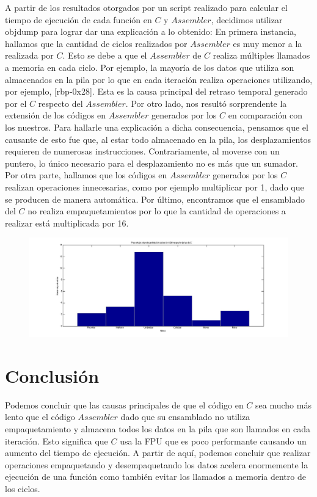 \documentclass[10pt, a4paper]{article}
\begin{document}
A partir de los resultados otorgados por un script realizado para calcular el tiempo de ejecución de cada función en $C$ y $Assembler$, decidimos utilizar objdump para lograr dar una explicación a lo obtenido:\newline
En primera instancia, hallamos que la cantidad de ciclos realizados por $Assembler$ es muy menor a la realizada por $C$. Esto se debe a que el $Assembler$ de $C$ realiza múltiples llamados a memoria en cada ciclo. Por ejemplo, la mayoría de los datos que utiliza son almacenados en la pila por lo que en cada iteración realiza operaciones utilizando, por ejemplo, [rbp-0x28]. Esta es la causa principal del retraso temporal generado por el $C$ respecto del $Assembler$. \newline 
Por otro lado, nos resultó sorprendente la extensión de los códigos en $Assembler$ generados por los $C$ en comparación con los nuestros. Para hallarle una explicación a dicha consecuencia, pensamos que el causante de esto fue que, al estar todo almacenado en la pila, los desplazamientos requieren de numerosas instrucciones. Contrariamente, al moverse con un puntero, lo único necesario para el desplazamiento no es más que un sumador. \newline
Por otra parte, hallamos que los códigos en $Assembler$ generados por los $C$ realizan operaciones innecesarias, como por ejemplo multiplicar por 1, dado que se producen de manera automática.\newline
Por último, encontramos que el ensamblado del $C$ no realiza empaquetamientos por lo que la cantidad de operaciones a realizar está multiplicada por 16.\newline
\begin{figure}[H] %
\begin{center}
\includegraphics[width=520pt]{./velocidad.jpg}
\end{center}
\end{figure}
\section{Conclusi\'on}
Podemos concluir que las causas principales de que el código en $C$ sea mucho más lento que el código $Assembler$ dado que su ensamblado no utiliza empaquetamiento y almacena todos los datos en la pila que son llamados en cada iteración. Esto significa que $C$ usa la FPU que es poco performante causando un aumento del tiempo de ejecución.\newline
A partir de aquí, podemos concluir que realizar operaciones empaquetando y desempaquetando los datos acelera enormemente la ejecución de una función como también evitar los llamados a memoria dentro de los ciclos.
\end{document}
